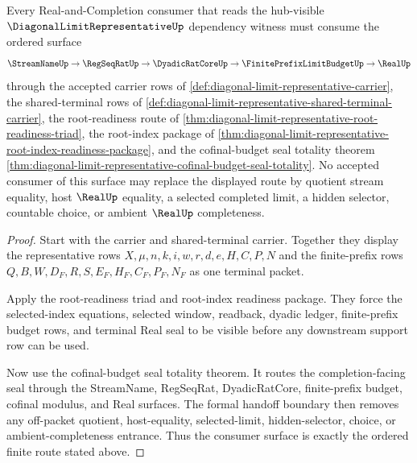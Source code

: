 \begin{theorem}
\label{thm:diagonal-limit-representative-root-unblock-consumer-surface}
Every Real-and-Completion consumer that reads the hub-visible $\DiagonalLimitRepresentativeUp$ dependency witness must consume the ordered surface
$$
\StreamNameUp \to \RegSeqRatUp \to \DyadicRatCoreUp \to \FinitePrefixLimitBudgetUp \to \RealUp
$$
through the accepted carrier rows of \autoref{def:diagonal-limit-representative-carrier}, the shared-terminal rows of \autoref{def:diagonal-limit-representative-shared-terminal-carrier}, the root-readiness route of \autoref{thm:diagonal-limit-representative-root-readiness-triad}, the root-index package of \autoref{thm:diagonal-limit-representative-root-index-readiness-package}, and the cofinal-budget seal totality theorem \autoref{thm:diagonal-limit-representative-cofinal-budget-seal-totality}. No accepted consumer of this surface may replace the displayed route by quotient stream equality, host $\RealUp$ equality, a selected completed limit, a hidden selector, countable choice, or ambient $\RealUp$ completeness.
\end{theorem}
\begin{proof}
Start with the carrier and shared-terminal carrier. Together they display the representative rows $X,\mu,n,k,i,w,r,d,e,H,C,P,N$ and the finite-prefix rows $Q,B,W,D_F,R,S,E_F,H_F,C_F,P_F,N_F$ as one terminal packet.

Apply the root-readiness triad and root-index readiness package. They force the selected-index equations, selected window, readback, dyadic ledger, finite-prefix budget rows, and terminal Real seal to be visible before any downstream support row can be used.

Now use the cofinal-budget seal totality theorem. It routes the completion-facing seal through the StreamName, RegSeqRat, DyadicRatCore, finite-prefix budget, cofinal modulus, and Real surfaces. The formal handoff boundary then removes any off-packet quotient, host-equality, selected-limit, hidden-selector, choice, or ambient-completeness entrance. Thus the consumer surface is exactly the ordered finite route stated above.
\end{proof}

